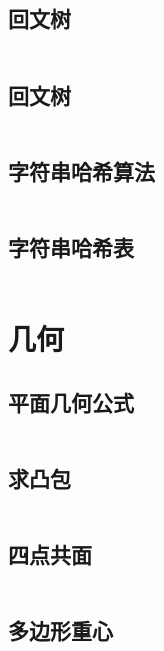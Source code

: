 \inputminted{cpp}{code/manacher2.cc}

\subsection{回文树} 

\inputminted{cpp}{code/PAM.cc}

\subsection{	回文树} 

\inputminted{cpp}{code/回文树.cc}

\subsection{字符串哈希算法} 

\inputminted{cpp}{code/stringhash.cc}

\subsection{字符串哈希表} 

\inputminted{cpp}{code/string_hashmap.cpp}

\newpage\section{几何} 
\subsection{平面几何公式} 

\inputminted{text}{code/Planegeometry.txt}

\subsection{求凸包} 

\inputminted{cpp}{code/Graham.cc}

\subsection{四点共面} 

\inputminted{cpp}{code/fourPointPlane.cc}

\subsection{多边形重心} 

